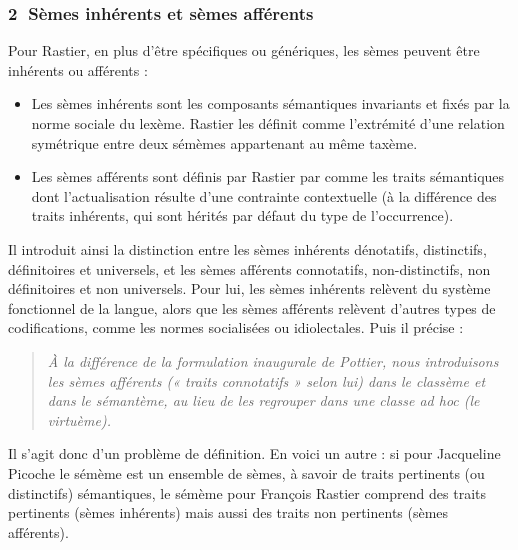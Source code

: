 \subsubsection*{\textcircled{\scriptsize 2} Sèmes inhérents et sèmes afférents}
Pour Rastier, en plus d’être spécifiques ou génériques, les sèmes peuvent être inhérents ou afférents :
\begin{itemize}
\item Les sèmes inhérents sont les composants sémantiques invariants et fixés par la norme sociale du lexème. Rastier les définit comme l’extrémité d’une relation symétrique entre deux sémèmes appartenant au même taxème.
\item Les sèmes afférents sont définis par Rastier par comme les traits sémantiques dont l’actualisation résulte d’une contrainte contextuelle (à la différence des traits inhérents, qui sont hérités par défaut du type de l’occurrence).
\end{itemize}
Il introduit ainsi la distinction entre les sèmes inhérents dénotatifs, distinctifs, définitoires et universels, et les sèmes afférents connotatifs, non-distinctifs, non définitoires et non universels. Pour lui, les sèmes inhérents relèvent du système fonctionnel de la langue, alors que les sèmes afférents relèvent d’autres types de codifications, comme les normes socialisées ou idiolectales. Puis il précise :
\begin{quote}\small\itshape
À la différence de la formulation inaugurale de Pottier, nous introduisons les sèmes afférents (« traits connotatifs » selon lui) dans le classème et dans le sémantème, au lieu de les regrouper dans une classe ad hoc (le virtuème).
\end{quote}
Il s’agit donc d’un problème de définition. En voici un autre : si pour Jacqueline Picoche le sémème est un ensemble de sèmes, à savoir de traits pertinents (ou distinctifs) sémantiques, le sémème pour François Rastier comprend des traits pertinents (sèmes inhérents) mais aussi des traits non pertinents (sèmes afférents).

